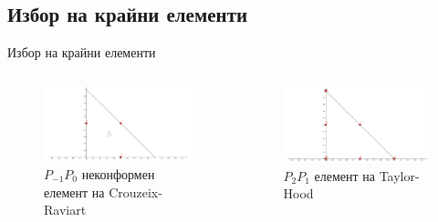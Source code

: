 \documentclass{beamer}
\begin{document}
   
    \subsection{Избор на крайни елементи}
    \begin{frame}{Избор на крайни елементи}
\begin{columns} 
    \begin{column}{.5\textwidth}
        \begin{figure}[H]
  \centering
  \includegraphics[width=\textwidth]{../../Figures/01_introduction/cr_element.pdf}
  \caption{$P_{-1}P_0$ неконформен елемент на Crouzeix-Raviart}
\end{figure}
    \end{column}
    \begin{column}{.5\textwidth}
\begin{figure}[H]
  \centering
  \includegraphics[width=\textwidth]{../../Figures/01_introduction/tylor_hood_element.pdf}
  \caption{$P_2P_1$ елемент на Taylor-Hood}
\end{figure}
    \end{column}%

\end{columns}
    \end{frame}
    
\end{document}
